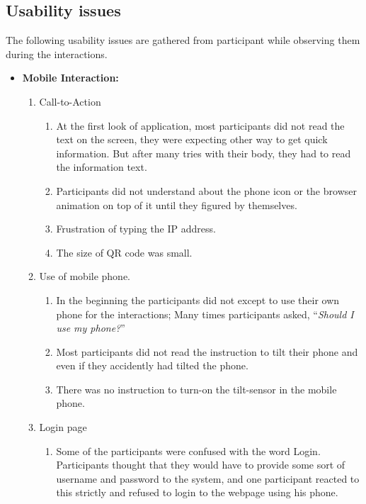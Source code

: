 \subsection{Usability issues}
The following usability issues are gathered from participant while observing them during the interactions.


\begin{itemize}

\item \textbf{Mobile Interaction:}
\begin{enumerate}
\item	Call-to-Action
\begin{enumerate}
\item At the first look of application, most participants did not read the text on the screen, they were expecting other way to get quick information. But after many tries with their body, they had to read the information text. 

\item   Participants did not understand about the phone icon or the browser animation on top of it until they figured by themselves.
\item   Frustration of typing the IP address.
\item   The size of QR code was small.
\end{enumerate}


\item   Use of mobile phone.
\begin{enumerate}
\item   In the beginning the participants did not except to use their own phone for the interactions; Many times participants asked, ``\emph{Should I use my phone?}'' 
\item   Most participants did not read the instruction to tilt their phone and even if they accidently had tilted the phone.
\item   There was no instruction to turn-on the tilt-sensor in the mobile phone.
\end{enumerate}

\item   Login page
\begin{enumerate}
\item   Some of the participants were confused with the word Login. Participants thought that they would have to provide some sort of username and password to the system, and one participant reacted to this strictly and refused to login to the webpage using his phone.
\end{enumerate}


\end{enumerate}
\end{itemize}
